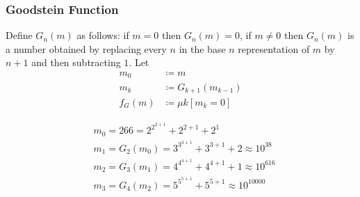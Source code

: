 \documentclass[UTF8,11pt,colorlinks,compress,openany]{beamer}%
\begin{document}
\begin{frame}\frametitle{Goodstein Function}
\setlength\abovedisplayskip{0pt}
\setlength\belowdisplayskip{0pt}
	\begin{definition}
		Define $G_n(m)$ as follows: if $m=0$ then $G_n(m)=0$, if $m\neq 0$ then $G_n(m)$ is a number obtained by replacing every $n$ in the base $n$ representation of $m$ by $n + 1$ and then subtracting $1$. Let
		\begin{align*}
		m_0&\coloneqq m\\
		m_k&\coloneqq G_{k+1}(m_{k-1})\\
		f_G(m)&\coloneqq \mu k[m_k=0]
		\end{align*}
	\end{definition}
	\begin{align*}
	&m_0=266=2^{2^{2+1}}+2^{2+1}+2^1\\
	&m_1=G_2(m_0)=3^{3^{3+1}}+3^{3+1}+2\approx 10^{38}\\
	&m_2=G_3(m_1)=4^{4^{4+1}}+4^{4+1}+1\approx 10^{616}\\
	&m_3=G_4(m_2)=5^{5^{5+1}}+5^{5+1}\approx 10^{10000}
	\end{align*}
\end{frame}
\end{document}
